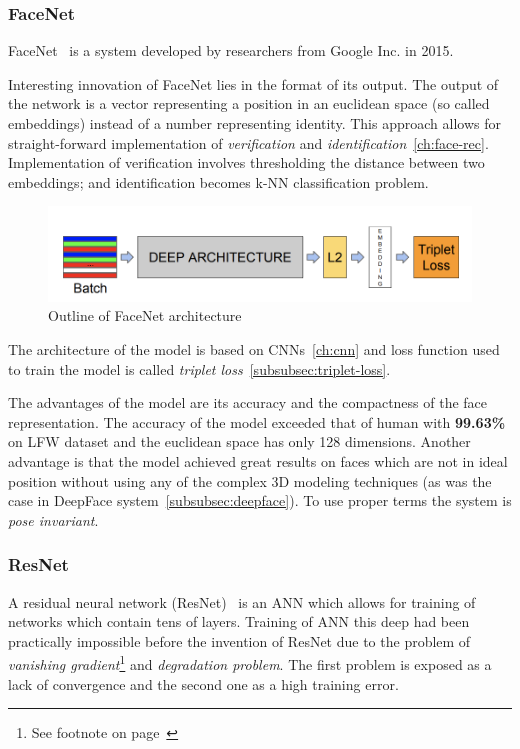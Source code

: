 \subsubsection{FaceNet}\label{subsubsec:facenet}
FaceNet~\cite{FaceNet} is a system developed by researchers from Google Inc. in 2015.

Interesting innovation of FaceNet lies in the format of its output.
The output of the network is a vector representing a position in an euclidean space (so called embeddings) instead of a
number representing identity.
This approach allows for straight-forward implementation of \textit{verification} and
\textit{identification}~\ref{ch:face-rec}.
Implementation of verification involves thresholding the distance between two embeddings; and identification becomes
k-NN classification problem.

\begin{figure}[H]
    \centering
    \includegraphics[width=\columnwidth]{images/face-recognition/facenet.png}
    \caption{Outline of FaceNet architecture~\cite{FaceNet}}
    \label{fig:facenet}
\end{figure}

The architecture of the model is based on CNNs~\ref{ch:cnn} and loss function used to train the model is called
\textit{triplet loss}~\ref{subsubsec:triplet-loss}.

The advantages of the model are its accuracy and the compactness of the face representation.
The accuracy of the model exceeded that of human with \textbf{99.63\%} on LFW dataset and the euclidean space has only
128 dimensions.
Another advantage is that the model achieved great results on faces which are not in ideal position without using any
of the complex 3D modeling techniques (as was the case in DeepFace system~\ref{subsubsec:deepface}).
To use proper terms the system is \textit{pose invariant}.

\subsubsection{ResNet}\label{subsubsec:resnet}
A residual neural network (ResNet)~\cite{ResNet} is an ANN which allows for training of networks which contain tens
of layers.
Training of ANN this deep had been practically impossible before the invention of ResNet due to the problem of
\textit{vanishing gradient}\footnote{See footnote on page~\pageref{foot:vangrad}} and \textit{degradation problem}.
The first problem is exposed as a lack of convergence and the second one as a high training error.

